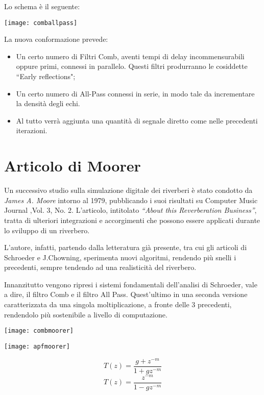 Lo schema è il seguente:

\begin{center}
\texttt{[image: comballpass]}
\end{center}

La nuova conformazione prevede:
\begin{itemize}
\item Un certo numero di Filtri Comb, aventi tempi di delay incommensurabili oppure primi, connessi in parallelo. Questi filtri produrranno le cosiddette “Early reflections";
\item Un certo numero di All-Pass connessi in serie, in modo tale da incrementare la densità degli echi.
\item Al tutto verrà aggiunta una quantità di segnale diretto come nelle precedenti iterazioni.
\end{itemize}

\section{Articolo di Moorer}

Un successivo studio sulla simulazione digitale dei riverberi è stato condotto da \emph{James A. Moore} intorno al 1979, pubblicando i suoi risultati  su Computer Music Journal ,Vol. 3, No. 2.
L’articolo, intitolato \emph{“About this Reverberation Business”}, tratta di ulteriori integrazioni e accorgimenti che possono essere applicati durante lo sviluppo di un riverbero.

L’autore, infatti, partendo dalla letteratura già presente, tra cui gli articoli di Schroeder e J.Chowning, sperimenta nuovi algoritmi, rendendo più snelli i precedenti, sempre tendendo ad una realisticità del riverbero.

Innanzitutto vengono ripresi i sistemi fondamentali dell’analisi di Schroeder, vale a dire, il filtro Comb e il filtro All Pass. Quest’ultimo in una seconda versione caratterizzata da una singola moltiplicazione, a fronte delle 3 precedenti, rendendolo più sostenibile a livello di computazione.

\begin{center}
\texttt{[image: combmoorer]}

\texttt{[image: apfmoorer]}
\end{center}

\begin{equation}
T(z) = \frac{g + z^{-m}}{1+gz^{-m}}
\end{equation}
\begin{equation}
T(z) = \frac{z^{-m}}{1-gz^{-m}}
\end{equation}


